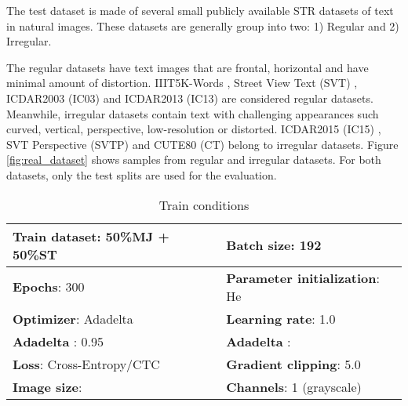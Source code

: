 \documentclass[runningheads]{llncs}
\begin{document}
The test dataset is made of several small publicly available STR datasets of text in natural images. These datasets are generally group into two: 1) Regular and 2) Irregular. 

The regular datasets have text images that are frontal, horizontal and have minimal amount of distortion. IIIT5K-Words \cite{mishra2012scene}, Street View Text (SVT) \cite{wang2011end}, ICDAR2003 (IC03) \cite{lucas2005icdar} and ICDAR2013 (IC13) \cite{karatzas2013icdar} are considered regular datasets. Meanwhile, irregular datasets contain text with challenging appearances such curved, vertical, perspective, low-resolution or distorted. ICDAR2015 (IC15) \cite{karatzas2015icdar}, SVT Perspective (SVTP) \cite{phan2013recognizing} and CUTE80 (CT) \cite{risnumawan2014robust} belong to irregular datasets. Figure \ref{fig:real_dataset} shows samples from regular and irregular datasets. For both datasets, only the test splits are used for the evaluation.

\begin{table}[]
    \centering
    \caption{Train conditions}
    \begin{tabular}{|l|l|}
    \hline
        \textbf{Train dataset}: 50\%MJ + 50\%ST & \textbf{Batch size}: 192\\
    \hline
        \textbf{Epochs}: 300 & \textbf{Parameter initialization}:  He \cite{he2015delving} \\
    \hline
         \textbf{Optimizer}: Adadelta \cite{zeiler2012adadelta} & \textbf{Learning rate}: 1.0\\
    \hline
         \textbf{Adadelta }: 0.95 & \textbf{Adadelta }: \\
    \hline
        \textbf{Loss}: Cross-Entropy/CTC & \textbf{Gradient clipping}: 5.0 \\
    \hline
        \textbf{Image size}:  & \textbf{Channels}: 1 (grayscale) \\
    \hline
    \end{tabular}
    \label{tab:train_condition}
\end{table}
\end{document}

